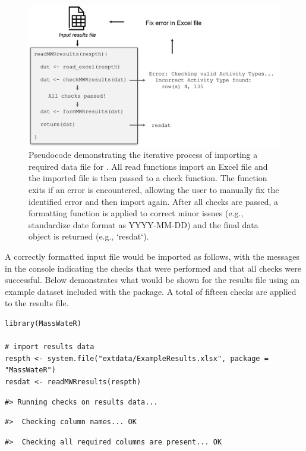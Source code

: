 \begin{figure}
\includegraphics[width=1\linewidth]{figs/importflow} \caption{Pseudocode demonstrating the iterative process of importing a required data file for .  All read functions import an Excel file and the imported file is then passed to a check function.  The function exits if an error is encountered, allowing the user to manually fix the identified error and then import again.  After all checks are passed, a formatting function is applied to correct minor issues (e.g., standardize date format as YYYY-MM-DD) and the final data object is returned (e.g., `resdat`).}\label{fig:importflow}
\end{figure}

A correctly formatted input file would be imported as follows, with the messages in the console indicating the checks that were performed and that all checks were successful. Below demonstrates what would be shown for the results file using an example dataset included with the package. A total of fifteen checks are applied to the results file.

\begin{verbatim}
library(MassWateR)

# import results data
respth <- system.file("extdata/ExampleResults.xlsx", package = "MassWateR")
resdat <- readMWRresults(respth)
\end{verbatim}

\begin{verbatim}
#> Running checks on results data...
\end{verbatim}

\begin{verbatim}
#>  Checking column names... OK
\end{verbatim}

\begin{verbatim}
#>  Checking all required columns are present... OK
\end{verbatim}

